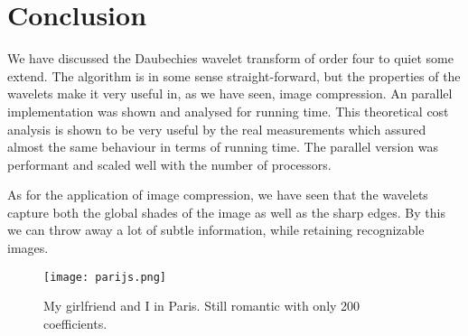 
\section{Conclusion}
\label{sec:conc}

We have discussed the Daubechies wavelet transform of order four to quiet some extend. The algorithm is in some sense straight-forward, but the properties of the wavelets make it very useful in, as we have seen, image compression. An parallel implementation was shown and analysed for running time. This theoretical cost analysis is shown to be very useful by the real measurements which assured almost the same behaviour in terms of running time. The parallel version was performant and scaled well with the number of processors.

As for the application of image compression, we have seen that the wavelets capture both the global shades of the image as well as the sharp edges. By this we can throw away a lot of subtle information, while retaining recognizable images.

\vspace{3cm}
\begin{figure}[H]
	\centering
	\texttt{[image: parijs.png]}
	\caption{My girlfriend and I in Paris. Still romantic with only 200 coefficients.}
\end{figure}
